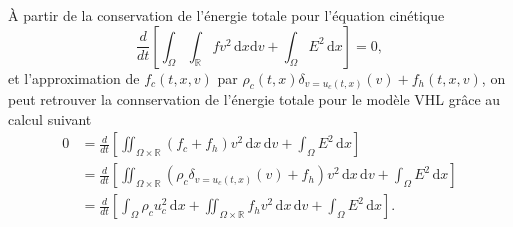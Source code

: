\begin{remark}
  À partir de la conservation de l'énergie totale pour l'équation cinétique 
  $$
    \frac{d}{dt} \left[ \int_\Omega \int_{\mathbb{R}} f v^2 \,\mathrm{d}x\mathrm{d}v + \int_\Omega E^2 \,\mathrm{d}x\right] = 0, 
  $$
  et l'approximation de $f_c(t, x, v)$ par $\rho_c(t, x) \delta_{v=u_c(t, x)}(v) + f_h(t, x, v)$, on peut retrouver la connservation 
  de l'\'energie totale pour le mod\`ele VHL gr\^ace au calcul suivant 
  $$
    \begin{aligned}
      0 &= \frac{d}{dt} \left[ \iint_{\Omega\times\mathbb{R}} (f_c + f_h) v^2 \,\mathrm{d}x\,\mathrm{d}v + \int_\Omega E^2 \,\mathrm{d}x\right] \\
        &= \frac{d}{dt} \left[\iint_{\Omega\times\mathbb{R}} (\rho_c \delta_{v=u_c(t, x)}(v)  + f_h) v^2 \,\mathrm{d}x\,\mathrm{d}v + \int_\Omega E^2 \,\mathrm{d}x\right] \\
        &= \frac{d}{dt} \left[ \int_\Omega \rho_c u_c^2 \,\mathrm{d}x+ \iint_{\Omega\times\mathbb{R}} f_h v^2 \,\mathrm{d}x\,\mathrm{d}v + \int_\Omega E^2 \,\mathrm{d}x\right]. 
    \end{aligned}
  $$
\end{remark}

